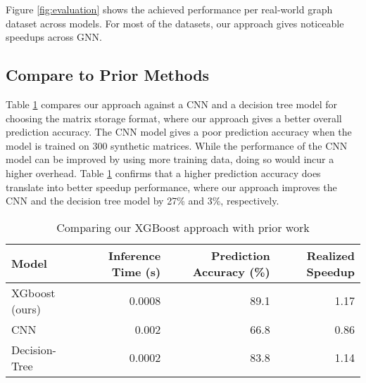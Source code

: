 Figure \ref{fig:evaluation} shows the achieved performance per real-world graph dataset across models. For most of the datasets, our approach gives noticeable speedups across GNN.

\vspace{-2mm}
\subsection{Compare to Prior Methods}
\vspace{-2mm}
Table \ref{tab:sota_compare} compares our approach against a CNN and a decision tree model for choosing the matrix storage format, where our approach gives a better overall prediction accuracy. The CNN model gives a poor prediction accuracy when the model is trained on 300 synthetic matrices. While the performance of the CNN model can be improved by using more training data, doing so would incur a higher overhead. Table \ref{tab:sota_compare} confirms that a higher prediction accuracy does translate into better speedup performance, where our approach improves the CNN and the decision tree model by 27\% and 3\%, respectively.

\begin{table}[t!]
\caption{Comparing our XGBoost approach with prior work}
\vspace{-2mm}
    \centering
    \scriptsize
    \begin{tabular}{lrrr}
    \toprule
    \textbf{Model} & \textbf{Inference Time (s)} & \textbf{Prediction Accuracy (\%)} & \textbf{Realized Speedup}\\
    \midrule
    XGboost (ours) & 0.0008 & 89.1 & 1.17\\
    CNN \cite{zhao2018bridging,pichel2019sparse} & 0.002 & 66.8 & 0.86\\
    Decision-Tree \cite{sedaghati2015automatic} & 0.0002 & 83.8 & 1.14\\
    \bottomrule
    \end{tabular}
    \label{tab:sota_compare}
    \vspace{-3mm}
\end{table}

\vspace{-2mm}
